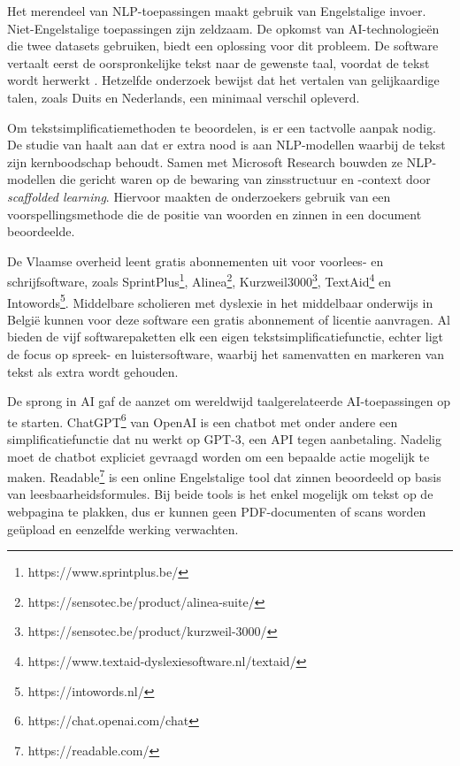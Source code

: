 Het merendeel van NLP-toepassingen maakt gebruik van Engelstalige invoer. Niet-Engelstalige toepassingen zijn zeldzaam. De opkomst van AI-technologieën die twee datasets gebruiken, biedt een oplossing voor dit probleem. De software vertaalt eerst de oorspronkelijke tekst naar de gewenste taal, voordat de tekst wordt herwerkt \autocite{Sciforce2020}. Hetzelfde onderzoek bewijst dat het vertalen van gelijkaardige talen, zoals Duits en Nederlands, een minimaal verschil opleverd.

Om tekstsimplificatiemethoden te beoordelen, is er een tactvolle aanpak nodig. De studie van \textcite{Swayamdipta2019} haalt aan dat er extra nood is aan NLP-modellen waarbij de tekst zijn kernboodschap behoudt. Samen met Microsoft Research bouwden ze NLP-modellen die gericht waren op de bewaring van zinsstructuur en -context door \emph{scaffolded learning}. Hiervoor maakten de onderzoekers gebruik van een voorspellingsmethode die de positie van woorden en zinnen in een document beoordeelde.

De Vlaamse overheid leent gratis abonnementen uit voor voorlees- en schrijfsoftware, zoals \newline SprintPlus\footnote{https://www.sprintplus.be/}, Alinea\footnote{https://sensotec.be/product/alinea-suite/}, Kurzweil3000\footnote{https://sensotec.be/product/kurzweil-3000/}, TextAid\footnote{https://www.textaid-dyslexiesoftware.nl/textaid/} en Intowords\footnote{https://intowords.nl/}. Middelbare scholieren met dyslexie in het middelbaar onderwijs in België kunnen voor deze software een gratis abonnement of licentie aanvragen. Al bieden de vijf softwarepaketten elk een eigen tekstsimplificatiefunctie, echter ligt de focus op spreek- en luistersoftware, waarbij het samenvatten en markeren van tekst als extra wordt gehouden.

De sprong in AI gaf de aanzet om wereldwijd taalgerelateerde AI-toepassingen op te starten. ChatGPT\footnote{https://chat.openai.com/chat} van OpenAI is een chatbot met onder andere een simplificatiefunctie dat nu werkt op GPT-3, een API tegen aanbetaling. Nadelig moet de chatbot expliciet gevraagd worden om een bepaalde actie mogelijk te maken. Readable\footnote{https://readable.com/} is een online Engelstalige tool dat zinnen beoordeeld op basis van leesbaarheidsformules. Bij beide tools is het enkel mogelijk om tekst op de webpagina te plakken, dus er kunnen geen PDF-documenten of scans worden geüpload en eenzelfde werking verwachten.

